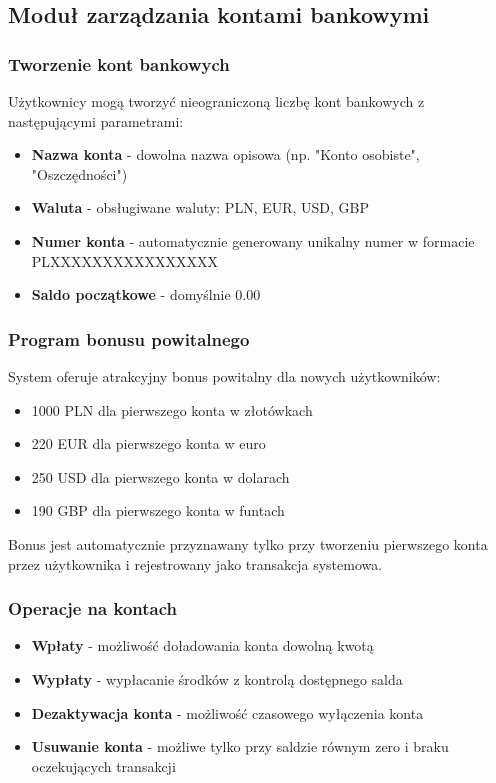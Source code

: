 \documentclass[12pt,a4paper]{article}
\begin{document}
    \subsection{Moduł zarządzania kontami bankowymi}

    \subsubsection{Tworzenie kont bankowych}
    Użytkownicy mogą tworzyć nieograniczoną liczbę kont bankowych z następującymi parametrami:
    \begin{itemize}
        \item \textbf{Nazwa konta} - dowolna nazwa opisowa (np. "Konto osobiste", "Oszczędności")
        \item \textbf{Waluta} - obsługiwane waluty: PLN, EUR, USD, GBP
        \item \textbf{Numer konta} - automatycznie generowany unikalny numer w formacie PLXXXXXXXXXXXXXXXX
        \item \textbf{Saldo początkowe} - domyślnie 0.00
    \end{itemize}

    \subsubsection{Program bonusu powitalnego}
    System oferuje atrakcyjny bonus powitalny dla nowych użytkowników:
    \begin{itemize}
        \item 1000 PLN dla pierwszego konta w złotówkach
        \item 220 EUR dla pierwszego konta w euro
        \item 250 USD dla pierwszego konta w dolarach
        \item 190 GBP dla pierwszego konta w funtach
    \end{itemize}

    Bonus jest automatycznie przyznawany tylko przy tworzeniu pierwszego konta przez użytkownika i rejestrowany jako transakcja systemowa.

    \subsubsection{Operacje na kontach}
    \begin{itemize}
        \item \textbf{Wpłaty} - możliwość doładowania konta dowolną kwotą
        \item \textbf{Wypłaty} - wypłacanie środków z kontrolą dostępnego salda
        \item \textbf{Dezaktywacja konta} - możliwość czasowego wyłączenia konta
        \item \textbf{Usuwanie konta} - możliwe tylko przy saldzie równym zero i braku oczekujących transakcji
    \end{itemize}
\end{document}
